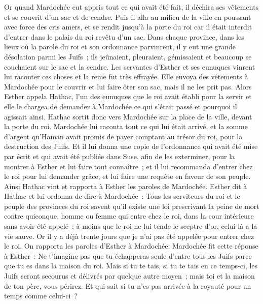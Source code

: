 \begin{multicols}{2}
\VerseOne{}Or quand Mardochée eut appris tout ce qui avait été fait, il déchira ses vêtements et se couvrit d'un sac et de cendre. Puis il alla au milieu de la ville en poussant avec force des cris amers,
et se rendit jusqu'à la porte du roi car il était interdit d'entrer dans le palais du roi revêtu d'un sac.
Dans chaque province, dans les lieux où la parole du roi et son ordonnance parvinrent, il y eut une grande désolation parmi les Juifs~; ils jeûnaient, pleuraient, gémissaient et beaucoup se couchaient sur le sac et la cendre.
Les servantes d'Esther et ses eunuques vinrent lui raconter ces choses et la reine fut très effrayée. Elle envoya des vêtements à Mardochée pour le couvrir et lui faire ôter son sac, mais il ne les prit pas.
Alors Esther appela Hathac, l'un des eunuques que le roi avait établi pour la servir et elle le chargea de demander à Mardochée ce qui s'était passé et pourquoi il agissait ainsi.
Hathac sortit donc vers Mardochée sur la place de la ville, devant la porte du roi.
Mardochée lui raconta tout ce qui lui était arrivé, et la somme d'argent qu'Haman avait promis de payer comptant au trésor du roi, pour la destruction des Juifs.
Et il lui donna une copie de l'ordonnance qui avait été mise par écrit et qui avait été publiée dans Suse, afin de les exterminer, pour la montrer à Esther et lui faire tout connaître~; et il lui recommanda d'entrer chez le roi pour lui demander grâce, et lui faire une requête en faveur de son peuple.
Ainsi Hathac vint et rapporta à Esther les paroles de Mardochée.
Esther dit à Hathac et lui ordonna de dire à Mardochée~:
Tous les serviteurs du roi et le peuple des provinces du roi savent qu'il existe une loi prescrivant la peine de mort contre quiconque, homme ou femme qui entre chez le roi, dans la cour intérieure sans avoir été appelé~; à moins que le roi ne lui tende le sceptre d'or, celui-là a la vie sauve. Or il y a déjà trente jours que je n'ai pas été appelée pour entrer chez le roi.
On rapporta les paroles d'Esther à Mardochée.
Mardochée fit cette réponse à Esther~: Ne t'imagine pas que tu échapperas seule d'entre tous les Juifs parce que tu es dans la maison du roi.
Mais si tu te tais, si tu te tais en ce temps-ci, les Juifs seront secourus et délivrés par quelque autre moyen~; mais toi et la maison de ton père, vous périrez. Et qui sait si tu n'es pas arrivée à la royauté pour un temps comme celui-ci~?

\end{multicols}
